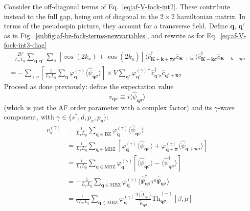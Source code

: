 Consider the off-diagonal terms of Eq.~\eqref{eq:af-V-fock-int2}. These contribute instead to the full gap, being out of diagonal in the $2\times2$ hamiltonian matrix. In terms of the pseudospin picture, they account for a transverse field. Define $\mathbf{q}$, $\mathbf{q}'$ as in Fig.~\ref{subfig:af-bz-fock-terms-newvariables}, and rewrite as for Eq.~\eqref{eq:af-V-fock-int3-diag}
\begin{multline}
	-\frac{2V}{L_x L_y} \sum_{\mathbf{q}, \mathbf{q}'} \sum_\sigma [
		\cos \left(
			2k_x
		\right)	+ \cos \left(
			2k_y
		\right)	
	] \langle
	\hat c_{\mathbf{K}+\mathbf{k}+\bm{\pi} \sigma}^\dagger 
	\hat c_{\mathbf{K}+\mathbf{k} \sigma}
	\rangle
	\hat c_{\mathbf{K}-\mathbf{k} \sigma}^\dagger \hat c_{\mathbf{K}-\mathbf{k}-\bm{\pi} \sigma} \\
	= -\sum_{\gamma,\sigma} \left[
		\frac{1}{L_x L_y} \sum_\mathbf{q} \varphi_\mathbf{q}^{(\gamma)}
		\langle
			\hat \psi_{\mathbf{q}\sigma}
		\rangle
	\right] \times V
	\sum_{\mathbf{q}'}
	\varphi_{\mathbf{q}'}^{(\gamma)*}
	\hat c_{\mathbf{q}'\sigma}^\dagger
	\hat c_{\mathbf{q}'+\bm{\pi}\sigma} \label{eq:af-V-fock-int3-offdiag}
\end{multline}
Proceed as done previously: define the expectation value
\begin{equation}\label{eq:af-vqsigma-def}
	v_{\mathbf{q}\sigma} \equiv i\langle
		\hat \psi_{\mathbf{q}\sigma}
	\rangle
\end{equation}
(which is just the AF order parameter with a complex factor) and its $\gamma$-wave component, with $\gamma\in\lbrace s^*,d,p_x,p_y\rbrace$:
\begin{align}
	v^{(\gamma)}_\sigma &= \frac{i}{L_x L_y} \sum_{\mathbf{q}\in\mathrm{BZ}} \varphi_\mathbf{q}^{(\gamma)}
	\langle
		\hat \psi_{\mathbf{q}\sigma}
	\rangle \nonumber \\
	&= \frac{i}{L_x L_y} \sum_{\mathbf{q}\in\mathrm{MBZ}} \left[
		\varphi_\mathbf{q}^{(\gamma)}
		\langle
			\hat \psi_{\mathbf{q}\sigma}
		\rangle
		+
		\varphi_{\mathbf{q}+\bm{\pi}}^{(\gamma)}
		\langle
			\hat \psi_{\mathbf{q}+\bm{\pi}\sigma}
		\rangle
	\right] \nonumber \\
	&= \frac{i}{L_x L_y} \sum_{\mathbf{q}\in\mathrm{MBZ}} \varphi_\mathbf{q}^{(\gamma)} \left[
		\langle
			\hat \psi_{\mathbf{q}\sigma}
		\rangle
		-
		\langle
			\hat \psi_{\mathbf{q}\sigma}^\dagger
		\rangle
	\right] \nonumber \\
	&= -\frac{1}{L_x L_y} \sum_{\mathbf{q}\in\mathrm{MBZ}} \varphi_\mathbf{q}^{(\gamma)}
	\langle
		\hat \Psi_{\mathbf{q}\sigma}^\dagger \tau^y \hat \Psi_{\mathbf{q}\sigma}
	\rangle \nonumber \\
	&= \frac{1}{2L_x L_y} \sum_{\mathbf{q}\in\mathrm{MBZ}} \varphi_\mathbf{q}^{(\gamma)}
	\frac{\Im\lbrace\tilde{\Delta}_{\mathbf{q}\sigma}\rbrace}{\tilde{E}_{\mathbf{q}\sigma}} \tilde{\mathrm{Th}}_{\mathbf{q}\sigma}^{(-)}[\beta,\tilde{\mu}] \label{eq:af-vgamma-chain}
\end{align}
